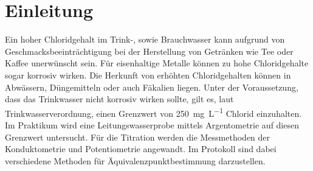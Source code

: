 %
\pagebreak
\section{Einleitung}
\label{sec:einleitung}
Ein hoher Chloridgehalt im Trink-, sowie Brauchwasser kann aufgrund von Geschmacksbeeinträchtigung bei der Herstellung von Getränken wie Tee oder Kaffee unerwünscht sein. Für eisenhaltige Metalle können zu hohe Chloridgehalte sogar korrosiv wirken. Die Herkunft von erhöhten Chloridgehalten können in Abwässern, Düngemitteln oder auch Fäkalien liegen. Unter der Voraussetzung, dass das Trinkwasser nicht korrosiv wirken sollte, gilt es, laut Trinkwasserverordnung, einen Grenzwert von \SI{250}{\milli \gram \per \liter} Chlorid einzuhalten.\\
Im Praktikum wird eine Leitungswasserprobe mittels Argentometrie auf diesen Grenzwert untersucht. Für die Titration werden die Messmethoden der Konduktometrie und Potentiometrie angewandt. Im Protokoll sind dabei verschiedene Methoden für Äquivalenzpunktbestimmung darzustellen. 




